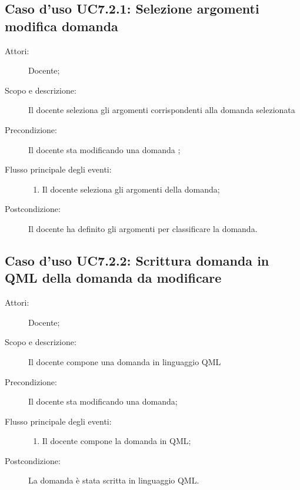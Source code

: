 \subsection{Caso d'uso UC7.2.1: Selezione argomenti modifica domanda}\begin{description}
\item[Attori:] Docente;
\item[Scopo e descrizione:] Il docente seleziona gli argomenti corrispondenti alla domanda selezionata
      \item[Precondizione:] Il docente sta modificando una domanda
;

        \item[Flusso principale degli eventi:] \begin{enumerate}
          \item Il docente seleziona gli argomenti della domanda;

      \end{enumerate}
    \item[Postcondizione:] Il docente ha definito gli argomenti per classificare la domanda.
  \end{description}
\hypertarget{UC7.2.2}{}
\subsection{Caso d'uso UC7.2.2: Scrittura domanda in QML della domanda da modificare}\begin{description}
\item[Attori:] Docente;
\item[Scopo e descrizione:] Il docente compone una domanda in linguaggio QML
      \item[Precondizione:] Il docente sta modificando una domanda;

        \item[Flusso principale degli eventi:] \begin{enumerate}
          \item Il docente compone la domanda in QML;

      \end{enumerate}
    \item[Postcondizione:] La domanda è stata scritta in linguaggio QML.
  \end{description}
\hypertarget{UC7.2.3}{}
